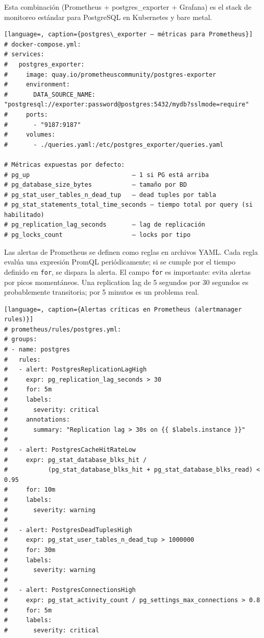 Esta combinación (Prometheus + postgres\_exporter + Grafana) es el stack de monitoreo estándar para PostgreSQL en Kubernetes y bare metal.

\begin{lstlisting}[language=, caption={postgres\_exporter — métricas para Prometheus}]
# docker-compose.yml:
# services:
#   postgres_exporter:
#     image: quay.io/prometheuscommunity/postgres-exporter
#     environment:
#       DATA_SOURCE_NAME: "postgresql://exporter:password@postgres:5432/mydb?sslmode=require"
#     ports:
#       - "9187:9187"
#     volumes:
#       - ./queries.yaml:/etc/postgres_exporter/queries.yaml

# Métricas expuestas por defecto:
# pg_up                            — 1 si PG está arriba
# pg_database_size_bytes           — tamaño por BD
# pg_stat_user_tables_n_dead_tup   — dead tuples por tabla
# pg_stat_statements_total_time_seconds — tiempo total por query (si habilitado)
# pg_replication_lag_seconds       — lag de replicación
# pg_locks_count                   — locks por tipo
\end{lstlisting}

Las alertas de Prometheus se definen como reglas en archivos YAML.
Cada regla evalúa una expresión PromQL periódicamente; si se cumple por el tiempo definido en \texttt{for}, se dispara la alerta.
El campo \texttt{for} es importante: evita alertas por picos momentáneos.
Una replication lag de 5 segundos por 30 segundos es probablemente transitoria; por 5 minutos es un problema real.

\begin{lstlisting}[language=, caption={Alertas críticas en Prometheus (alertmanager rules)}]
# prometheus/rules/postgres.yml:
# groups:
# - name: postgres
#   rules:
#   - alert: PostgresReplicationLagHigh
#     expr: pg_replication_lag_seconds > 30
#     for: 5m
#     labels:
#       severity: critical
#     annotations:
#       summary: "Replication lag > 30s on {{ $labels.instance }}"
#
#   - alert: PostgresCacheHitRateLow
#     expr: pg_stat_database_blks_hit /
#           (pg_stat_database_blks_hit + pg_stat_database_blks_read) < 0.95
#     for: 10m
#     labels:
#       severity: warning
#
#   - alert: PostgresDeadTuplesHigh
#     expr: pg_stat_user_tables_n_dead_tup > 1000000
#     for: 30m
#     labels:
#       severity: warning
#
#   - alert: PostgresConnectionsHigh
#     expr: pg_stat_activity_count / pg_settings_max_connections > 0.8
#     for: 5m
#     labels:
#       severity: critical
\end{lstlisting}

